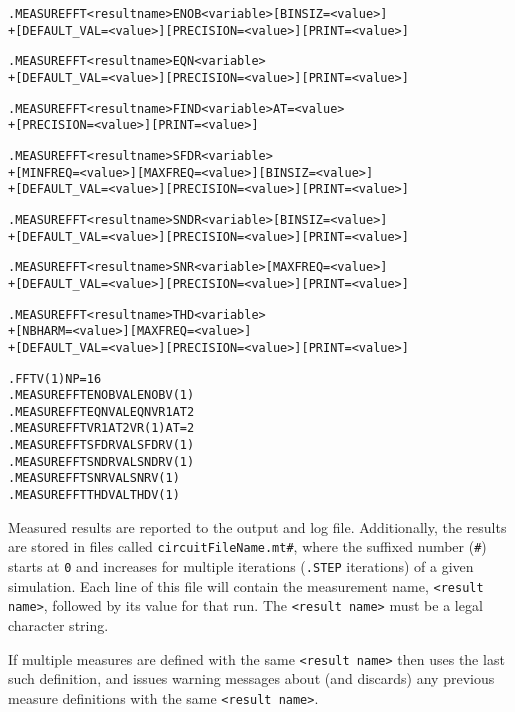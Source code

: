 \begin{Command}
\format
\begin{alltt}
.MEASURE FFT <result name> ENOB <variable> [BINSIZ=<value>]
+ [DEFAULT_VAL=<value>] [PRECISION=<value>] [PRINT=<value>]

.MEASURE FFT <result name> EQN <variable>
+ [DEFAULT_VAL=<value>] [PRECISION=<value>] [PRINT=<value>]

.MEASURE FFT <result name> FIND <variable> AT=<value>
+ [PRECISION=<value>] [PRINT=<value>]

.MEASURE FFT <result name> SFDR <variable>
+ [MINFREQ=<value>] [MAXFREQ=<value>]  [BINSIZ=<value>]
+ [DEFAULT_VAL=<value>] [PRECISION=<value>] [PRINT=<value>]

.MEASURE FFT <result name> SNDR <variable>  [BINSIZ=<value>]
+ [DEFAULT_VAL=<value>] [PRECISION=<value>] [PRINT=<value>]

.MEASURE FFT <result name> SNR <variable> [MAXFREQ=<value>]
+ [DEFAULT_VAL=<value>] [PRECISION=<value>] [PRINT=<value>]

.MEASURE FFT <result name> THD <variable>
+ [NBHARM=<value>] [MAXFREQ=<value>]
+ [DEFAULT_VAL=<value>] [PRECISION=<value>] [PRINT=<value>]

\end{alltt}

\examples
\begin{alltt}
.FFT V(1) NP=16
.MEASURE FFT ENOBVAL ENOB V(1)
.MEASURE FFT EQNVAL EQN VR1AT2
.MEASURE FFT VR1AT2 VR(1) AT=2
.MEASURE FFT SFDRVAL SFDR V(1)
.MEASURE FFT SNDRVAL SNDR V(1)
.MEASURE FFT SNRVAL SNR V(1)
.MEASURE FFT THDVAL THD V(1)
\end{alltt}

\arguments

\begin{Arguments}

Measured results are reported to the output and log file.
Additionally, the results are stored in files called
\texttt{circuitFileName.mt\#}, where the suffixed number
(\texttt{\#}) starts at \texttt{0} and increases for multiple
iterations (\texttt{.STEP} iterations) of a given simulation. Each
line of this file will contain the measurement name, \texttt{<result
name>}, followed by its value for that run.  The \texttt{<result
name>} must be a legal \Xyce{} character string.

If multiple measures are defined with the same \texttt{<result name>} then
\Xyce{} uses the last such definition, and issues warning messages about
(and discards) any previous measure definitions with the same
\texttt{<result name>}.


\end{Arguments}
\end{Command}
